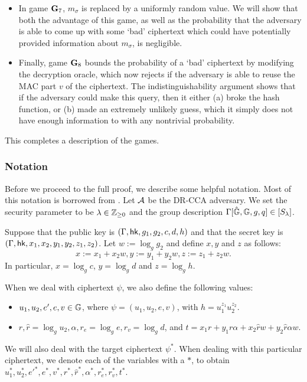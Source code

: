 \begin{itemize}
	\item In game $\mathbf{G}_7$, $m_\sigma$ is replaced by a uniformly random value. We will show that both the advantage of this game, as well as the probability that the adversary is able to come up with some `bad' ciphertext which could have potentially provided information about $m_\sigma$, is negligible.
	\item Finally, game $\mathbf{G}_8$ bounds the probability of a `bad' ciphertext by modifying the decryption oracle, which now rejects if the adversary is able to reuse the MAC part $v$ of the ciphertext. The indistinguishability argument shows that if the adversary could make this query, then it either (a) broke the hash function, or (b) made an extremely unlikely guess, which it simply does not have enough information to with any nontrivial probability.
\end{itemize}

This completes a description of the games. 

\subsubsection{Notation} Before we proceed to the full proof, we describe some helpful notation. Most of this notation is borrowed from \cite{cs01}. Let $\mathcal{A}$ be the DR-CCA adversary. We set the security parameter to be $\lambda\in\mathbb{Z}_{\geq 0}$ and the group description $\Gamma[\hat{\mathbb{G}},\mathbb{G},g,q]\in[S_\lambda]$.

Suppose that the public key is $(\Gamma,\mathsf{hk},g_1, g_2, c,d,h)$ and that the secret key is $(\Gamma,\mathsf{hk},x_1,x_2,y_1,y_2,z_1,z_2)$. Let $w:=\log_{g}g_2$ and define $x,y$ and $z$ as follows: $$x:=x_1+x_2w, y:= y_1+y_2w, z:= z_1+z_2w.$$ In particular, $x=\log_{g}c$, $y=\log_gd$ and $z=\log_g h$.

When we deal with ciphertext $\psi$, we also define the following values:
\begin{itemize}
	\item $u_1,u_2,e',e,v\in\mathbb{G}$, where $\psi = (u_1,u_2,e,v)$, with $h = u_1^{z_1}u_2^{z_2}$.
	\item $r,\hat{r} = \log_gu_2, \alpha, r_e = \log_ge, r_v = \log_g d$, and $t = x_1r + y_1r\alpha + x_2\hat{r}w + y_2\hat{r}\alpha w$.
\end{itemize}

We will also deal with the target ciphertext $\psi^{*}$. When dealing with this particular ciphertext, we denote each of the variables with a $*$, to obtain $u_1^{*}, u_2^{*}, {e'}^{*}, e^{*}, v^{*}, r^{*},\hat{r}^{*}, \alpha^{*}, r_e^{*}, r_v^{*}, t^{*}.$


